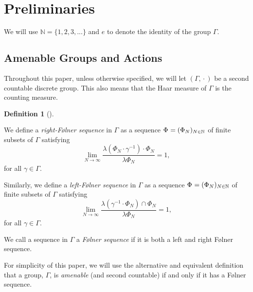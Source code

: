 \documentclass[
  british,
]{article}
\theoremstyle{definition}
\newtheorem{definition}{Definition}[section]
\theoremstyle{plain}
\theoremstyle{plain}
\theoremstyle{remark}
\newcommand{\AmenableGroup}{{\Gamma}}
\newcommand{\GroupElement}{{\gamma}}
\newcommand{\Inverse}[1]{{#1}^{-1}}
\newcommand{\Folner}[1][\vphantom{}]{{\Phi}_{#1}}
\newcommand{\Identity}{{e}}
\newcommand{\CountingMeasure}{{\lambda}}
\newcommand{\Group}{{\Gamma}}
\newcommand{\N}{\mathbb{N}}
\newcommand{\GroupOperation}[2]{{#1}\cdot{#2}}
\begin{document}
\section{Preliminaries}\label{preliminaries}

We will use \(\N=\{1,2,3,...\}\) and \(\Identity\) to denote the
identity of the group \(\AmenableGroup\).

\subsection{Amenable Groups and
Actions}\label{amenable-groups-and-actions}

Throughout this paper, unless otherwise specified, we will let
\((\AmenableGroup,\GroupOperation{}{})\) be a second countable discrete
group. This also means that the Haar measure of \(\AmenableGroup\) is
the counting measure.

\begin{definition}[]\protect\hypertarget{def-FolnerSequenceDef}{}\label{def-FolnerSequenceDef}

We define a \emph{right-Følner sequence} in \(\Group\) as a sequence
\(\Folner =(\Folner[N])_{N\in\mathbb{N}}\) of finite subsets of
\(\Group\) satisfying
\[\lim_{N\rightarrow\infty}\frac{\CountingMeasure{\GroupOperation{(\GroupOperation{\Folner[N]}{\Inverse{\GroupElement}})}{\Folner[N]}}}{\CountingMeasure{\Folner[N]}}=1,\]
for all \(\GroupElement\in\Group\).

Similarly, we define a \emph{left-Følner sequence} in \(\Group\) as a
sequence \(\Folner =(\Folner[N])_{N\in\mathbb{N}}\) of finite subsets of
\(\Group\) satisfying
\[\lim_{N\rightarrow\infty}\frac{\CountingMeasure{(\Inverse{\GroupElement}\cdot\Folner[N])\cap\Folner[N]}}{\CountingMeasure{\Folner[N]}}=1,\]
for all \(\GroupElement\in\Group\).

We call a sequence in \(\Group\) a \emph{Følner sequence} if it is both
a left and right Følner sequence.

\end{definition}

For simplicity of this paper, we will use the alternative and equivalent
definition that a group, \(\AmenableGroup\), is \emph{amenable} (and
second countable) if and only if it has a Følner sequence.
\end{document}

